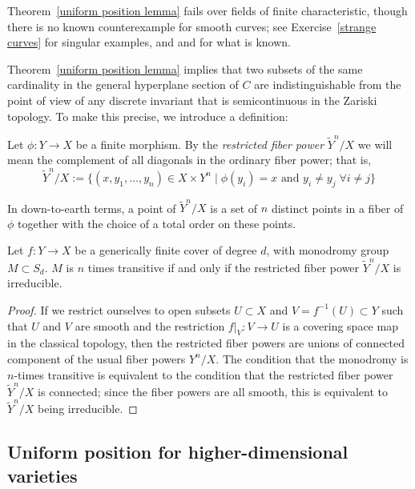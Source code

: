Theorem~\ref{uniform position lemma} fails over fields of finite characteristic, though there is no known counterexample for smooth curves; see Exercise~\ref{strange curves} for singular examples, and \cite{Rathmann} and \cite{Kadets} for what is known. 

Theorem~\ref{uniform position lemma} implies that two subsets of the same cardinality in the general hyperplane section of $C$
are indistinguishable from the point of view of any discrete invariant that is semicontinuous in the Zariski topology. To make this precise, we introduce a definition:

\begin{definition}
Let $\phi : Y \to X$ be a finite morphism. By the \emph{restricted fiber power} $\tilde Y^n/X$ we will mean the complement of all diagonals in the ordinary fiber power; that is,
$$
\tilde Y^n/X := \{ (x, y_1,\dots, y_n) \in X \times Y^n \mid \phi(y_i) = x \text{ and } y_i \neq y_j \; \forall i \neq j \}
$$
\end{definition}

In down-to-earth terms, a point of $\tilde Y^n/X$ is a set of $n$ distinct points in a fiber of $\phi$ together with
the choice of a total order on these points. 

\begin{lemma}\label{transitivity lemma}
Let $f : Y \to X$ be a generically finite cover of degree $d$, with  monodromy group $M \subset S_d$.
$M$ is $n$ times transitive if and only if the restricted fiber power $\tilde Y^n/X$ is irreducible.
\end{lemma}

\begin{proof}
If we restrict ourselves to open subsets $U \subset X$ and $V = f^{-1}(U) \subset Y$ such that $U$ and $V$ are smooth and the restriction $f|_V : V \to U$ is a covering space map in the classical topology, then the restricted fiber powers are unions of connected component of the usual fiber powers $Y^n/X$. The condition that the monodromy is $n$-times transitive is equivalent to the condition that the restricted fiber power $\tilde Y^n/X$ is connected; since the fiber powers are all smooth, this is equivalent to $\tilde Y^n/X$ being irreducible.
\end{proof}

\subsection{Uniform position for higher-dimensional varieties}

